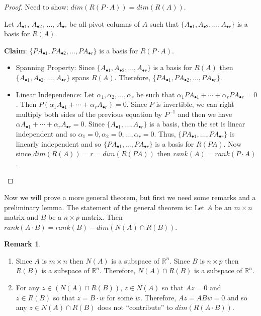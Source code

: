 \documentclass[12pt]{article}
\theoremstyle{definition}
\newtheorem*{remark}{Remark}
\begin{document}
\begin{proof}
Need to show: $dim(R(P \cdot A)) = dim(R(A))$.

Let $A_{\bullet 1}$, $A_{\bullet 2}$, $\ldots$, $A_{\bullet r}$ be all pivot columns of $A$ such that
$ \{A_{\bullet 1}, A_{\bullet 2}, \ldots, A_{\bullet r} \} $ is a basis for $R(A)$.

\textbf{Claim}: $\{PA_{\bullet 1}, PA_{\bullet 2}, \dots, PA_{\bullet r} \}$ is a basis for $R(P \cdot A)$.

\begin{itemize}
\item Spanning Property: Since $\{ A_{\bullet 1}, A_{\bullet 2}, \ldots, A_{\bullet r} \}$ is a basis
for $R(A)$ then $\{ A_{\bullet 1}, A_{\bullet 2}, \ldots, A_{\bullet r} \}$ spans $R(A)$. Therefore,
$\{ PA_{\bullet 1}, PA_{\bullet 2}, \ldots, PA_{\bullet r} \}$.

\item Linear Independence: Let $\alpha_1, \alpha_2, \ldots, \alpha_r$ be such that
$\alpha_1 PA_{\bullet 1} + \cdots + \alpha_r PA_{\bullet r} = 0$. Then
$P (\alpha_1 A_{\bullet 1} + \cdots + \alpha_r A_{\bullet r}) = 0$. Since $P$ is invertible,
we can right multiply both sides of the previous equation by $P^{-1}$ and then we have
$\alpha A_{\bullet 1} + \cdots + \alpha_r A_{\bullet r} = 0$. Since
$\{A_{\bullet 1}, \ldots, A_{\bullet r} \}$ is a basis, then the set is linear
independent and so $\alpha_1 = 0, \alpha_2 = 0, \ldots, \alpha_r = 0$. Thus,
$\{ PA_{\bullet 1}, \ldots, PA_{\bullet r} \}$ is linearly independent and so
$\{ PA_{\bullet 1}, \ldots, PA_{\bullet r} \}$ is a basis for $R(PA)$. Now since
$dim(R(A)) = r = dim(R(PA))$ then $rank(A) = rank(P\cdot A)$.


\end{itemize}
\end{proof}

Now we will prove a more general theorem, but first we need some remarks and 
a preliminary lemma. The statement of the general theorem is: Let $A$ be an $m \times n$
matrix and $B$ be a $n \times p$ matrix. Then $rank(A \cdot B) = rank(B) - 
dim(N(A) \cap R(B))$.

\begin{remark} $ $
\begin{enumerate}[label = (\arabic*)]
\item Since $A$ is $m \times n$ then $N(A)$ is a subspace of $\mathbb{R}^n$. Since $B$ is
$n \times p$ then $R(B)$ is a subspace of $\mathbb{R}^n$. Therefore, $N(A) \cap R(B)$ is
a subspace of $\mathbb{R}^n$.

\item For any $z \in (N(A) \cap R(B))$, $z \in N(A)$ so that $Az = 0$ and $z \in R(B)$ so that
$z = B\cdot w$ for some $w$. Therefore, $Az = ABw = 0$ and so any $z \in N(A) \cap R(B)$ does
not ``contribute'' to $dim(R(A \cdot B))$.
\end{enumerate}
\end{remark}
\end{document}
